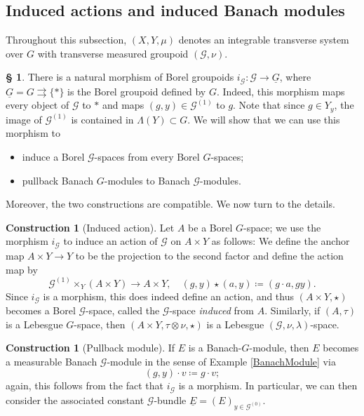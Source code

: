 \documentclass[11pt, oneside]{amsart}
\theoremstyle{definition}
\newtheorem{con}[lemma]{Construction}
\newtheorem{no}[lemma]{\S}
\theoremstyle{remark}
\theoremstyle{TheoremNum}
\newcommand{\cG}{\mathcal{G}}
\begin{document}
\subsection{Induced actions and induced Banach modules}\label{sec:3.3}
Throughout this subsection,  $(X, Y, \mu)$ denotes an integrable transverse system over $G$ with transverse measured groupoid $(\cG, \nu)$.

\begin{no} There is a natural morphism of Borel groupoids $i_{\cG}: \cG \to \underline{G}$, where $\underline{G} = G \rightrightarrows \{*\}$ is the Borel groupoid defined by $G$. Indeed, this morphism maps every object of $\cG$ to $*$ and maps $(g,y) \in \cG^{(1)}$ to $g$. Note that since $g \in Y_y$, the image of $\cG^{(1)}$ is contained in $\Lambda(Y) \subset G$. We will show that we can use this morphism to 
\begin{itemize}
\item induce a Borel $\cG$-spaces from every Borel $G$-spaces;
\item pullback Banach $G$-modules to Banach $\cG$-modules.
\end{itemize}
Moreover, the two constructions are compatible. We now turn to the details.
\end{no}
\begin{con}[Induced action] \label{ConStarAction}
Let $A$ be a Borel $G$-space; we use the morphism $i_{\cG}$ to induce an action of $\cG$ on $A \times Y$ as follows: We define the anchor map $A \times Y \to Y$ to be the projection to the second factor and define the action map by
\begin{equation}\label{GeneralStarAction}
\cG^{(1)} \times_Y (A \times Y) \to A \times Y, \quad (g,y) \star (a,y) \coloneqq  (g\cdot a, g y).
\end{equation}
Since $i_{\cG}$ is a morphism, this does indeed define an action, and thus $(A \times Y, \star)$ becomes a Borel $\cG$-space, called the $\cG$-space \emph{induced} from $A$. Similarly, if $(A, \tau)$ is a Lebesgue $G$-space, then $(A \times Y, \tau \otimes \nu, \star)$ is a Lebesgue $(\cG, \nu, \lambda)$-space. 
\end{con}
\begin{con}[Pullback module]\label{PullbackModules} If $E$ is a Banach-$G$-module, then $E$ becomes a measurable Banach $\cG$-module in the sense of Example \ref{BanachModule} via \[(g,y) \cdot v \coloneqq g \cdot v;\] again, this follows from the fact that $i_{\cG}$ is a morphism. In particular, we can then consider the associated constant $\cG$-bundle $\underline{E} = (E)_{y \in \cG^{(0)}}$.
\end{con}
\end{document}
